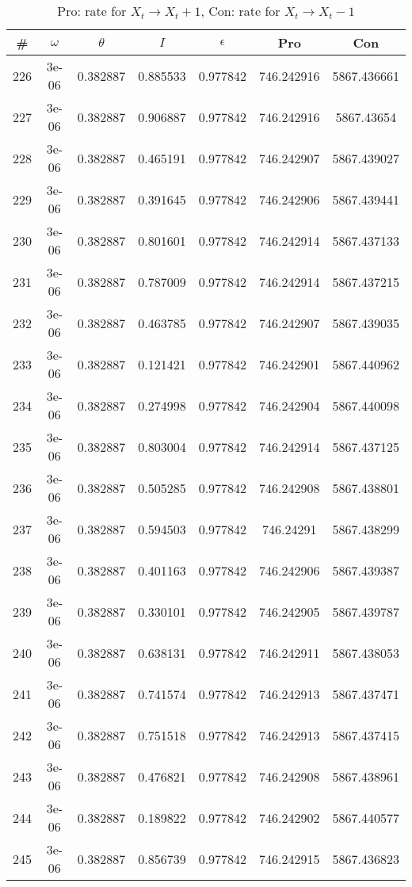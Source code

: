 \newpage
\begin{table}
\caption{Pro: rate for $X_t \rightarrow X_t + 1$, Con: rate for $X_t \rightarrow X_t - 1$}
\begin{tabular*}{\linewidth}{c|c|c|c|c|c|c}
\# & $\omega$ & $\theta$ & $I$ & $\epsilon$ & Pro & Con \\
\hline
226 & 3e-06 & 0.382887 & 0.885533 & 0.977842 & 746.242916 & 5867.436661\\
227 & 3e-06 & 0.382887 & 0.906887 & 0.977842 & 746.242916 & 5867.43654\\
228 & 3e-06 & 0.382887 & 0.465191 & 0.977842 & 746.242907 & 5867.439027\\
229 & 3e-06 & 0.382887 & 0.391645 & 0.977842 & 746.242906 & 5867.439441\\
230 & 3e-06 & 0.382887 & 0.801601 & 0.977842 & 746.242914 & 5867.437133\\
231 & 3e-06 & 0.382887 & 0.787009 & 0.977842 & 746.242914 & 5867.437215\\
232 & 3e-06 & 0.382887 & 0.463785 & 0.977842 & 746.242907 & 5867.439035\\
233 & 3e-06 & 0.382887 & 0.121421 & 0.977842 & 746.242901 & 5867.440962\\
234 & 3e-06 & 0.382887 & 0.274998 & 0.977842 & 746.242904 & 5867.440098\\
235 & 3e-06 & 0.382887 & 0.803004 & 0.977842 & 746.242914 & 5867.437125\\
236 & 3e-06 & 0.382887 & 0.505285 & 0.977842 & 746.242908 & 5867.438801\\
237 & 3e-06 & 0.382887 & 0.594503 & 0.977842 & 746.24291 & 5867.438299\\
238 & 3e-06 & 0.382887 & 0.401163 & 0.977842 & 746.242906 & 5867.439387\\
239 & 3e-06 & 0.382887 & 0.330101 & 0.977842 & 746.242905 & 5867.439787\\
240 & 3e-06 & 0.382887 & 0.638131 & 0.977842 & 746.242911 & 5867.438053\\
241 & 3e-06 & 0.382887 & 0.741574 & 0.977842 & 746.242913 & 5867.437471\\
242 & 3e-06 & 0.382887 & 0.751518 & 0.977842 & 746.242913 & 5867.437415\\
243 & 3e-06 & 0.382887 & 0.476821 & 0.977842 & 746.242908 & 5867.438961\\
244 & 3e-06 & 0.382887 & 0.189822 & 0.977842 & 746.242902 & 5867.440577\\
245 & 3e-06 & 0.382887 & 0.856739 & 0.977842 & 746.242915 & 5867.436823\\

\end{tabular*}
\end{table}
